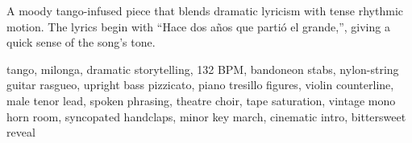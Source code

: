 

\begin{notes}
A moody tango-infused piece that blends dramatic lyricism with tense rhythmic motion. %
The lyrics begin with “Hace dos años que partió el grande,”, giving a quick sense of the song’s tone.
\end{notes}

\begin{style}
tango, milonga, dramatic storytelling, 132 BPM, bandoneon stabs, nylon-string guitar rasgueo, upright bass pizzicato, piano tresillo figures, violin counterline, male tenor lead, spoken phrasing, theatre choir, tape saturation, vintage mono horn room, syncopated handclaps, minor key march, cinematic intro, bittersweet reveal
\end{style}

